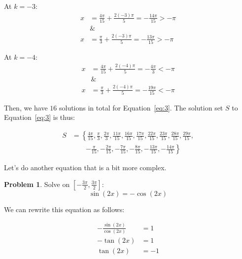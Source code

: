 \documentclass[12pt]{article}
\theoremstyle{definition}
\newtheorem{problem}{Problem}
\begin{document}
At $k=-3$:
\begin{align}
    x & =\frac{4\pi}{15} + \frac{2(-3)\pi}{5} = -\frac{14\pi}{15} > -\pi \\
      & \&                                                               \\
    x & =\frac{\pi}{3} + \frac{2(-3)\pi}{5} = -\frac{13\pi}{15} > -\pi
\end{align}

At $k=-4$:
\begin{align}
    x & =\frac{4\pi}{15} + \frac{2(-4)\pi}{5} = -\frac{4\pi}{3} < -\pi \\
      & \&                                                             \\
    x & =\frac{\pi}{3} + \frac{2(-4)\pi}{5} = -\frac{19\pi}{15} < -\pi
\end{align}

Then, we have $16$ solutions in total for Equation~\eqref{eq:3}.
The solution set $S$ to Equation~\eqref{eq:3} is thus:

\begin{equation}
    \begin{aligned}
        S & = \left\{ \frac{4\pi}{15}, \frac{\pi}{3}, \frac{2\pi}{3}, \frac{11\pi}{15}, \frac{16\pi}{15}, \frac{17\pi}{15}, \frac{22\pi}{15}, \frac{23\pi}{15}, \frac{28\pi}{15}, \frac{29\pi}{15}, \right. \\
          & \qquad \left. -\frac{\pi}{15}, -\frac{2\pi}{15}, -\frac{7\pi}{15}, -\frac{8\pi}{15}, -\frac{13\pi}{15}, -\frac{14\pi}{15} \right\}
    \end{aligned}
\end{equation}

Let's do another equation that is a bit more complex.

\begin{problem}
Solve on $\displaystyle \left[-\frac{3\pi}{2}, \frac{3\pi}{2}\right]$:
\begin{equation*}
    \sin(2x) = -\cos(2x) \label{eq:4}
\end{equation*}
\end{problem}

We can rewrite this equation as follows:

\begin{align}
    -\frac{\sin(2x)}{\cos(2x)} & = 1  \\
    -\tan(2x)                  & = 1  \\
    \tan(2x)                   & = -1
\end{align}
\end{document}
